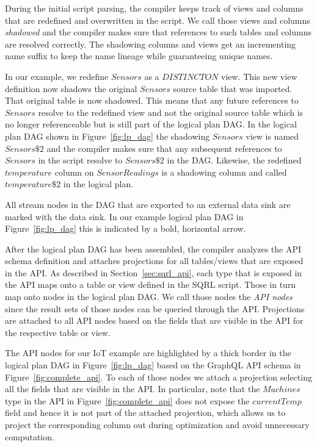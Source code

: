 \documentclass[	DIV=calc,%
							paper=letter,%
							fontsize=11pt,%
							twocolumn]{scrartcl}	 					%
\begin{document}
During the initial script parsing, the compiler keeps track of views and columns that are redefined and overwritten in the script. We call those views and columns \emph{shadowed} and the compiler makes sure that references to such tables and columns are resolved correctly. The shadowing columns and views get an incrementing name suffix to keep the name lineage while guaranteeing unique names.

In our example, we redefine $Sensors$ as a $DISTINCT ON$ view. This new view definition now shadows the original $Sensors$ source table that was imported. That original table is now shadowed. This means that any future references to $Sensors$ resolve to the redefined view and not the original source table which is no longer referenceable but is still part of the logical plan DAG. In the logical plan DAG shown in Figure~\ref{fig:lp_dag} the shadowing $Sensors$ view is named $Sensors\$2$ and the compiler makes sure that any subsequent references to $Sensors$ in the script resolve to $Sensors\$2$ in the DAG.
Likewise, the redefined $temperature$ column on $SensorReadings$ is a shadowing column and called $temperature\$2$ in the logical plan.

All stream nodes in the DAG that are exported to an external data sink are marked with the data sink. In our example logical plan DAG in Figure~\ref{fig:lp_dag} this is indicated by a bold, horizontal arrow.

After the logical plan DAG has been assembled, the compiler analyzes the API schema definition and attaches projections for all tables/views that are exposed in the API. As described in Section~\ref{sec:sqrl_api}, each type that is exposed in the API maps onto a table or view defined in the SQRL script. Those in turn map onto nodes in the logical plan DAG. We call those nodes the \emph{API nodes} since the result sets of those nodes can be queried through the API. Projections are attached to all API nodes based on the fields that are visible in the API for the respective table or view.

The API nodes for our IoT example are highlighted by a thick border in the logical plan DAG in Figure~\ref{fig:lp_dag} based on the GraphQL API schema in Figure~\ref{fig:complete_api}. To each of those nodes we attach a projection selecting all the fields that are visible in the API. In particular, note that the $Machines$ type in the API in Figure~\ref{fig:complete_api} does not expose the $currentTemp$ field and hence it is not part of the attached projection, which allows us to project the corresponding column out during optimization and avoid unnecessary computation.
\end{document}
